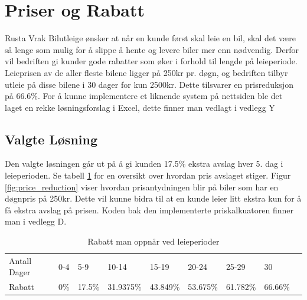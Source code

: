 \newpage
\section{Priser og Rabatt}
Rusta Vrak Bilutleige ønsker at når en kunde først skal leie en bil, skal det være så lenge som mulig for å slippe å hente og levere biler mer enn nødvendig. Derfor vil bedriften gi kunder gode rabatter som øker i forhold til lengde på leieperiode. Leieprisen av de aller fleste bilene ligger på 250kr pr. døgn, og bedriften tilbyr utleie på disse bilene i 30 dager for kun 2500kr. Dette tilsvarer en prisreduksjon på 66.6\%. For å kunne implementere et liknende system på nettsiden ble det laget en rekke løsningsforslag i Excel, dette finner man vedlagt i vedlegg Y

\subsection*{Valgte Løsning}
Den valgte løsningen går ut på å gi kunden 17.5\% ekstra avslag hver 5. dag i leieperioden. Se tabell \ref{table:percent} for en oversikt over hvordan pris avslaget stiger. Figur \ref{fig:price_reduction} viser hvordan prisantydningen blir på biler som har en døgnpris på 250kr. Dette vil kunne bidra til at en kunde leier litt ekstra kun for å få ekstra avslag på prisen. Koden bak den implementerte priskalkuatoren finner man i vedlegg D.

\begin{table}[htbp]
\centering
\caption{Rabatt man oppnår ved leieperioder}
\label{table:percent}
\begin{tabular}{|l|l|l|l|l|l|l|l|l}
\cline{1-8}
Antall Dager & 0-4   & 5-9    & 10-14     & 15-19    & 20-24    & 25-29    & 30      &  \\ \cline{1-8}
Rabatt       & 0\% & 17.5\% & 31.9375\% & 43.849\% & 53.675\% & 61.782\% & 66.66\% &  \\ \cline{1-8}
\end{tabular}
\end{table}



